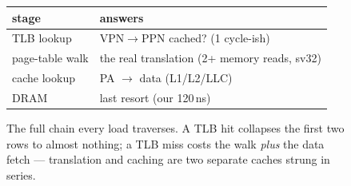 \begin{figure}[htbp]
\centering
\begin{tabular}{ll}
\toprule
stage & answers \\
\midrule
TLB lookup    & VPN$\to$PPN cached? (1 cycle-ish) \\
page-table walk & the real translation (2+ memory reads, sv32) \\
cache lookup  & PA $\to$ data (L1/L2/LLC) \\
DRAM          & last resort (our 120\,ns) \\
\bottomrule
\end{tabular}
\caption{The full chain every load traverses. A TLB hit collapses
the first two rows to almost nothing; a TLB miss costs the walk
\emph{plus} the data fetch --- translation and caching are two
separate caches strung in series.}
\label{fig:tlbchain11}
\end{figure}
